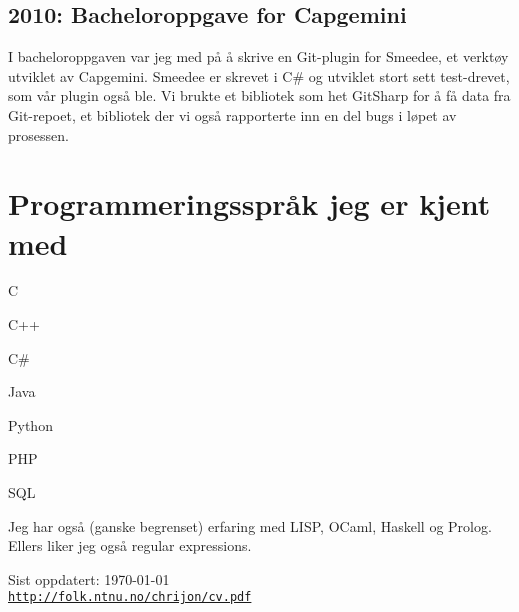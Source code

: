 \documentclass[letterpaper]{article}
\renewenvironment{itemize}{
  \begin{list}{}{
    \setlength{\leftmargin}{1.5em}
  }
}{
  \end{list}
}
\begin{document}
\subsection*{2010: Bacheloroppgave for Capgemini}
I bacheloroppgaven var jeg med på å skrive en Git-plugin for Smeedee,
et verktøy utviklet av Capgemini. Smeedee er skrevet i C\# og utviklet
stort sett test-drevet, som vår plugin også ble. Vi brukte
et bibliotek som het GitSharp for å få data fra Git-repoet, et
bibliotek der vi også rapporterte inn en del bugs i løpet av
prosessen. 

\section*{Programmeringsspråk jeg er kjent med}
\begin{itemize}
\item C
\item C++
\item C\#
\item Java
\item Python
\item PHP
\item SQL
\end{itemize}

Jeg har også (ganske begrenset) erfaring med LISP, OCaml, Haskell og 
Prolog. Ellers liker jeg også regular expressions.

\begin{center}
\begin{footnotesize}
Sist oppdatert: \today \\
\href{http://folk.ntnu.no/chrijon/cv.pdf}{\tt http://folk.ntnu.no/chrijon/cv.pdf}
\end{footnotesize}
\end{center}
\end{document}
